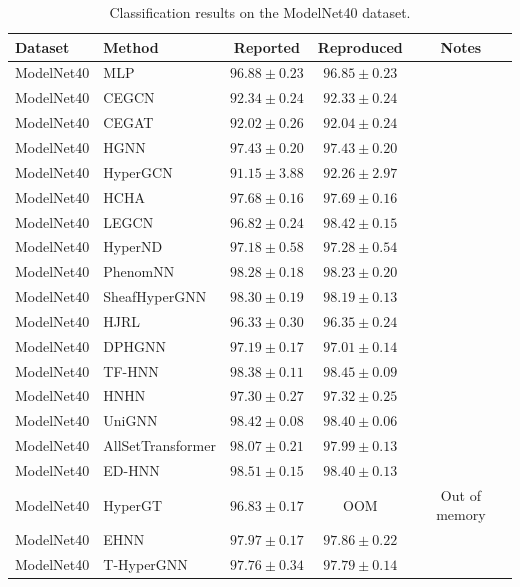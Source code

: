 \vspace{3em}

\begin{table}[H]
    \centering \small
    \renewcommand{\arraystretch}{1.12} 
    \begin{tabular}{llccc}
        \toprule
        Dataset & Method & Reported & Reproduced & Notes \\
        \midrule
        ModelNet40 & MLP & \(96.88 \pm 0.23\) & \(96.85 \pm 0.23\) & \\
        ModelNet40 & CEGCN & \(92.34 \pm 0.24\) & \(92.33 \pm 0.24\) & \\
        ModelNet40 & CEGAT & \(92.02 \pm 0.26\) & \(92.04 \pm 0.24\) & \\
        \grprule
        ModelNet40 & HGNN & \(97.43 \pm 0.20\) & \(97.43 \pm 0.20\) & \\
        ModelNet40 & HyperGCN & \(91.15 \pm 3.88\) & \(92.26 \pm 2.97\) & \\
        ModelNet40 & HCHA & \(97.68 \pm 0.16\) & \(97.69 \pm 0.16\) & \\
        ModelNet40 & LEGCN & \(96.82 \pm 0.24\) & \(98.42 \pm 0.15\) & \\
        ModelNet40 & HyperND & \(97.18 \pm 0.58\) & \(97.28 \pm 0.54\) & \\
        ModelNet40 & PhenomNN & \(98.28 \pm 0.18\) & \(98.23 \pm 0.20\) & \\
        ModelNet40 & SheafHyperGNN & \(98.30 \pm 0.19\) & \(98.19 \pm 0.13\) & \\
        ModelNet40 & HJRL & \(96.33 \pm 0.30\) & \(96.35 \pm 0.24\) & \\
        ModelNet40 & DPHGNN & \(97.19 \pm 0.17\) & \(97.01 \pm 0.14\) & \\
        ModelNet40 & TF-HNN & \(98.38 \pm 0.11\) & \(98.45 \pm 0.09\) & \\
        \grprule
        ModelNet40 & HNHN & \(97.30 \pm 0.27\) & \(97.32 \pm 0.25\) & \\
        ModelNet40 & UniGNN & \(98.42 \pm 0.08\) & \(98.40 \pm 0.06\) & \\
        ModelNet40 & AllSetTransformer & \(98.07 \pm 0.21\) & \(97.99 \pm 0.13\) & \\
        ModelNet40 & ED-HNN & \(98.51 \pm 0.15\) & \(98.40 \pm 0.13\) & \\
        ModelNet40 & HyperGT & \(96.83 \pm 0.17\) & OOM & Out of memory \\
        \grprule
        ModelNet40 & EHNN & \(97.97 \pm 0.17\) & \(97.86 \pm 0.22\) & \\
        ModelNet40 & T-HyperGNN & \(97.76 \pm 0.34\) & \(97.79 \pm 0.14\) & \\
        \bottomrule
    \end{tabular}
    \caption{Classification results on the ModelNet40 dataset.}
\end{table}

